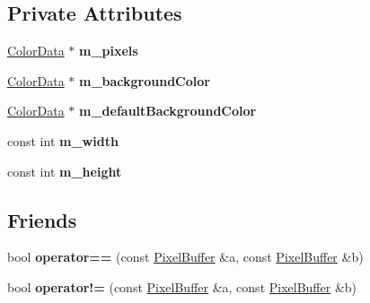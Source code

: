 \subsection*{Private Attributes}
\begin{DoxyCompactItemize}
\item 
\hypertarget{classPixelBuffer_abea92f97fac02c482e18497b71581e58}{\hyperlink{classColorData}{Color\-Data} $\ast$ {\bfseries m\-\_\-pixels}}\label{classPixelBuffer_abea92f97fac02c482e18497b71581e58}

\item 
\hypertarget{classPixelBuffer_a60fc7997d72641d0b49740b93f509dbb}{\hyperlink{classColorData}{Color\-Data} $\ast$ {\bfseries m\-\_\-background\-Color}}\label{classPixelBuffer_a60fc7997d72641d0b49740b93f509dbb}

\item 
\hypertarget{classPixelBuffer_aa14c833de33709f460035710f6af9689}{\hyperlink{classColorData}{Color\-Data} $\ast$ {\bfseries m\-\_\-default\-Background\-Color}}\label{classPixelBuffer_aa14c833de33709f460035710f6af9689}

\item 
\hypertarget{classPixelBuffer_a1eaf71f503d8808235a62787c03282a0}{const int {\bfseries m\-\_\-width}}\label{classPixelBuffer_a1eaf71f503d8808235a62787c03282a0}

\item 
\hypertarget{classPixelBuffer_a27122520f190977dc995cc32e806caa4}{const int {\bfseries m\-\_\-height}}\label{classPixelBuffer_a27122520f190977dc995cc32e806caa4}

\end{DoxyCompactItemize}
\subsection*{Friends}
\begin{DoxyCompactItemize}
\item 
\hypertarget{classPixelBuffer_a68aef4100a6c7062d102b566dc382543}{bool {\bfseries operator==} (const \hyperlink{classPixelBuffer}{Pixel\-Buffer} \&a, const \hyperlink{classPixelBuffer}{Pixel\-Buffer} \&b)}\label{classPixelBuffer_a68aef4100a6c7062d102b566dc382543}

\item 
\hypertarget{classPixelBuffer_a9751369b6acaba6bc42143cc2b7314ea}{bool {\bfseries operator!=} (const \hyperlink{classPixelBuffer}{Pixel\-Buffer} \&a, const \hyperlink{classPixelBuffer}{Pixel\-Buffer} \&b)}\label{classPixelBuffer_a9751369b6acaba6bc42143cc2b7314ea}

\end{DoxyCompactItemize}


